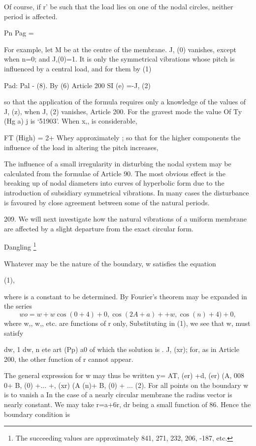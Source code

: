 Of course, if r' be such that the load lies on one of the nodal circles,
neither period is affected.

Pn Pag =

For example, let M be at the centre of the membrane. J, (0) vanishes,
except when n=0; and J,(0)=1. It is only the symmetrical vibrations
whose pitch is influenced by a central load, and for them by (1)

Pad: Pal - (8). By (6) Article 200 SI (e) =-J, (2)

so that the application of the formula requires only a knowledge of the
values of J, (z), when J, (2) vanishes, Article 200. For the gravest
mode the value Of Ty (Hg a) j is `51903'. When x,, is considerable,

FT (High) = 2+ Whey approximately ; so that for the higher components
the influence of the load in altering the pitch increases,

The influence of a small irregularity in disturbing the nodal system may
be calculated from the formulae of Article 90. The most obvious effect
is the breaking up of nodal diameters into curves of hyperbolic form due
to the introduction of subsidiary symmetrical vibrations. In many cases
the disturbance is favoured by close agreement between some of the
natural periods.

209. We will next investigate how the natural vibrations of a uniform
membrane are affected by a slight departure from the exact circular
form.

Dangling
\footnote{The succeeding values are approximately 841, 271, 232, 206, -187, etc.}

Whatever may be the nature of the boundary, w satisfies the equation

(1),

where is a constant to be determined. By Fourier's theorem may be
expanded in the series
\[wo = w + w \cos(0 +4) + 0, \cos(2 A+ a) + + w, \cos(n)+4) + 0,\]
where w,, w,, etc. are functions of r only, Substituting in (1), we see
that w, must satisfy

dw, 1 dw, n ete art (Pp) a0 of which the solution is . J, (xr); for, as
in Article 200, the other function of r cannot appear.

The general expression for w may thus be written y= AT, (er) +d, (er)
(A, 008 0+ B, (0) +... +, (xr) (A (n)+ B, (0) + ... (2). For all points
on the boundary w is to vanish a In the case of a nearly circular
membrane the radius vector is
nearly constant. We may take r=a+6r, dr being a small function of 86.
Hence the boundary condition is

